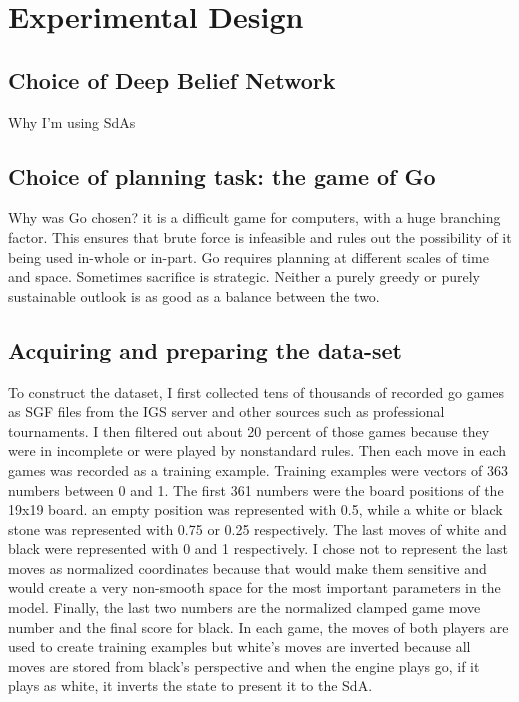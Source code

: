 \documentclass[12pt]{article}
\begin{document}
\section{Experimental Design}
	\subsection{Choice of Deep Belief Network}
	
Why I'm using SdAs
		
	\subsection{Choice of planning task: the game of Go}

Why was Go chosen? it is a difficult game for computers, with a huge branching factor. This ensures that brute force is infeasible and rules out the possibility of it being used in-whole or in-part. Go requires planning at different scales of time and space. Sometimes sacrifice is strategic. Neither a purely greedy or purely sustainable outlook is as good as a balance between the two.
	
	\subsection{Acquiring and preparing the data-set}
	
To construct the dataset, I first collected tens of thousands of recorded go games as SGF files from the IGS server and other sources such as professional tournaments. I then filtered out about 20 percent of those games because they were in incomplete or were played by nonstandard rules. Then each move in each games was recorded as a training example. Training examples were vectors of 363 numbers between 0 and 1. The first 361 numbers were the board positions of the 19x19 board. an empty position was represented with 0.5, while a white or black stone was represented with 0.75 or 0.25 respectively. The last moves of white and black were represented with 0 and 1 respectively. I chose not to represent the last moves as normalized coordinates because that would make them sensitive and would create a very non-smooth space for the most important parameters in the model. Finally, the last two numbers are the normalized clamped game move number and the final score for black. In each game, the moves of both players are used to create training examples but white's moves are inverted because all moves are stored from black's perspective and when the engine plays go, if it plays as white, it inverts the state to present it to the SdA.
\end{document}

